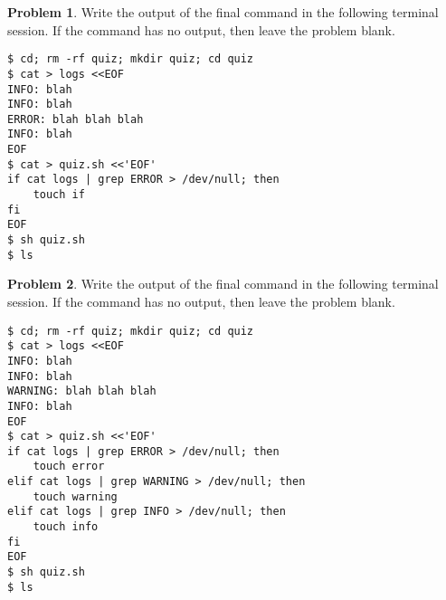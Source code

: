 \documentclass[10pt]{article}
\theoremstyle{definition}
\newtheorem{problem}{Problem}
\begin{document}
\filbreak
\begin{problem}
    Write the output of the final command in the following terminal session.
    If the command has no output, then leave the problem blank.
\end{problem}
\begin{lstlisting}
$ cd; rm -rf quiz; mkdir quiz; cd quiz
$ cat > logs <<EOF
INFO: blah
INFO: blah
ERROR: blah blah blah
INFO: blah
EOF
$ cat > quiz.sh <<'EOF'
if cat logs | grep ERROR > /dev/null; then
    touch if
fi
EOF
$ sh quiz.sh
$ ls
\end{lstlisting}


\filbreak
\begin{problem}
    Write the output of the final command in the following terminal session.
    If the command has no output, then leave the problem blank.
\end{problem}
\begin{lstlisting}
$ cd; rm -rf quiz; mkdir quiz; cd quiz
$ cat > logs <<EOF
INFO: blah
INFO: blah
WARNING: blah blah blah
INFO: blah
EOF
$ cat > quiz.sh <<'EOF'
if cat logs | grep ERROR > /dev/null; then
    touch error
elif cat logs | grep WARNING > /dev/null; then
    touch warning
elif cat logs | grep INFO > /dev/null; then
    touch info
fi
EOF
$ sh quiz.sh
$ ls
\end{lstlisting}

\filbreak
\end{document}
